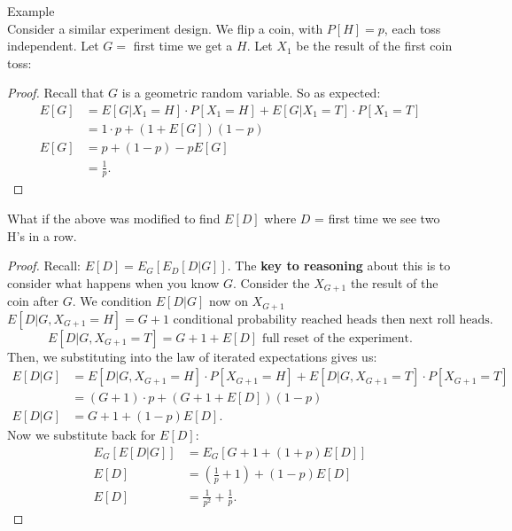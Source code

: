 \documentclass[a4paper]{article}
\begin{document}
 \begin{note}{Example}\\
   Consider a similar experiment design. We flip a coin, with $P[H] = p$, each  toss independent. Let
    $G =$ first time we get a $H$. Let $X_1$ be the result of the first coin toss:

    \begin{proof}
      Recall that $G$ is a geometric random variable. So as expected:
       \begin{align*}
         E[G] &= E[G | X_1 = H] \cdot P[X_1=H] + E[G|X_1 = T] \cdot P[X_1 = T] \\
              &= 1 \cdot p + (1+E[G])(1-p) \\
          E[G] &= p + (1-p) -p E[G] \\
               &= \frac{1}{p}
      .\end{align*}
    \end{proof}
\end{note}

\begin{remark}
  What if the above was modified to find $E[D]$ where  $D$ = first time we see two H's in a row. 

  \begin{proof}
    Recall: $E[D] = E_G[E_D[D|G]]$. The \textbf{key to reasoning} about this is to consider what happens
    when you know $G$. Consider the $X_{G+1}$ the result of the coin after $G$. We condition  $E[D|G]$ 
    now on  $X_{G+1}$
     \[
       E[D|G, X_{G+1} =H] = G + 1 \text{ conditional probability reached heads then next roll heads}
    .\] 
    \[
      E[D|G, X_{G+1} = T] = G + 1 + E[D] \text{ full reset of the experiment}
    .\] 
    Then, we substituting into the law of iterated expectations gives us:
    \begin{align*}
      E[D|G] &= E[D|G, X_{G+1} = H] \cdot P[X_{G+1} = H] + E[D|G, X_{G+1}=T] \cdot P[X_{G+1} =T] \\
             &= (G+1) \cdot p + (G+1+E[D]) (1-p) \\
      E[D|G] &= G+1 + (1-p)E[D]
    .\end{align*}
    Now we substitute back for $E[D]$:
     \begin{align*}
       E_{G}[E[D|G]] &= E_G[G+1 + (1+p)E[D]] \\
       E[D] &= \left( \frac{1}{p} + 1 \right) + (1-p)E[D] \\
       E[D] &= \frac{1}{p^2} + \frac{1}{p}
    .\end{align*}
  \end{proof}
\end{remark}
\end{document}
